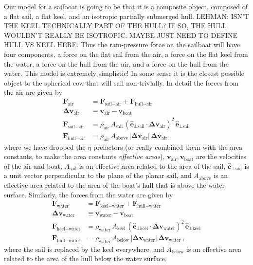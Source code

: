 \documentclass[letterpaper]{article}
\renewcommand{\vec}[1]{\boldsymbol{#1}}
\newcommand{\uvec}{\vec{\hat{e}}}
\newcommand{\air}{\text{air}}
\newcommand{\water}{\text{water}}
\newcommand{\boat}{\text{boat}}
\newcommand{\sail}{\text{sail}}
\newcommand{\keel}{\text{keel}}
\newcommand{\hull}{\text{hull}}
\renewcommand{\above}{\text{above}}
\newcommand{\below}{\text{below}}
\newcommand{\vair}{\vec{v}_\air}
\newcommand{\vwater}{\vec{v}_\water}
\newcommand{\vboat}{\vec{v}_\boat}
\begin{document}
Our model for a sailboat is going to be that it is a composite object, composed of a flat sail, a flat keel, and an isotropic partially submerged hull.
LEHMAN: ISN'T THE KEEL TECHNICALLY PART OF THE HULL? IF SO, THE HULL WOULDN'T REALLY BE ISOTROPIC. MAYBE JUST NEED TO DEFINE HULL VS KEEL HERE.
Thus the ram-pressure force on the sailboat will have four components, a force on the flat sail from the air, a force on the flat keel from the water, a force on the hull from the air, and a force on the hull from the water.
This model is extremely simplistic!
In some sense it is the closest possible object to the spherical cow that will sail non-trivially.
In detail the forces from the air are given by
\begin{align}\label{eq:startmodel}
  \vec{F}_\air &= \vec{F}_{\sail-\air} + \vec{F}_{\hull-\air}
  \\
  \vec{\Delta v}_\air &\equiv \vair - \vboat \label{eq:deltav}
  \\
  \vec{F}_{\sail-\air} & = \rho_\air\,A_\sail\,(\uvec_{\perp\sail}\cdot\vec{\Delta v}_\air)^2\,\uvec_{\perp\sail} \label{eq:Fsailair}
  \\
  \vec{F}_{\hull-\air} & = \rho_\air\,A_{\above}\,|\vec{\Delta v}_\air|\,\vec{\Delta v}_\air \label{eq:Fhullair} ~,
\end{align}
where we have dropped the $\eta$ prefactors (or really combined them with the area constants, to make the area constants \emph{effective areas}), $\vair,\vboat$ are the velocities of the air and boat, $A_\sail$ is an effective area related to the area of the sail, $\uvec_{\perp\sail}$ is a unit vector perpendicular to the plane of the planar sail, and $A_{\above}$ is an effective area related to the area of the boat's hull that is above the water surface.
Similarly, the forces from the water are given by
\begin{align}
  \vec{F}_\water &= \vec{F}_{\keel-\water} + \vec{F}_{\hull-\water}
  \\
  \vec{\Delta v}_\water &\equiv \vwater - \vboat
  \\
  \vec{F}_{\keel-\water} & = \rho_\water\,A_\keel\,(\uvec_{\perp\keel}\cdot\vec{\Delta v}_\water)^2\,\uvec_{\perp\keel}
  \\
  \vec{F}_{\hull-\water} & = \rho_\water\,A_{\below}\,|\vec{\Delta v}_\water|\,\vec{\Delta v}_\water ~,\label{eq:endmodel}
\end{align}
where the sail is replaced by the keel everywhere, and $A_{\below}$ is an effective area related to the area of the hull below the water surface.
\end{document}
